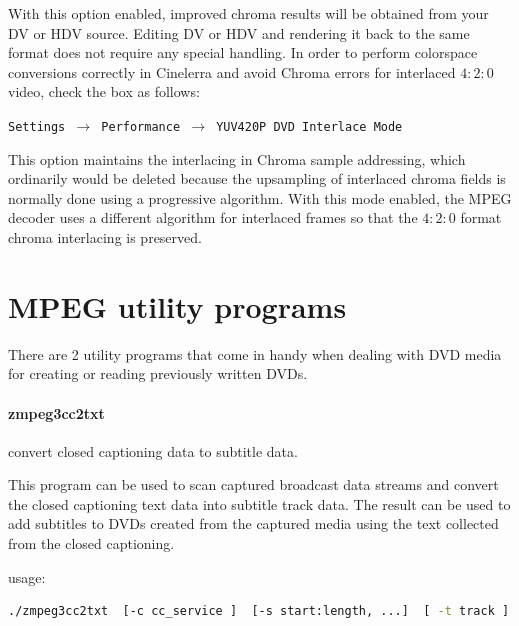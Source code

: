 With this option enabled, improved chroma results will be obtained from your DV or HDV source.
Editing DV or HDV and rendering it back to the same format does not require any special handling.
In order to perform colorspace conversions correctly in Cinelerra and avoid Chroma errors for interlaced $4:2:0$ video, check the box as follows:

\texttt{Settings $\rightarrow$ Performance $\rightarrow$ YUV420P DVD Interlace Mode}

This option maintains the interlacing in Chroma sample addressing, which ordinarily would be deleted
because the upsampling of interlaced chroma fields is normally done using a progressive algorithm.
With this mode enabled, the MPEG decoder uses a different algorithm for interlaced frames so that the
$4:2:0$ format chroma interlacing is preserved.

\section{MPEG utility programs}%
\label{sec:mpeg_utility_programs}

There are 2 utility programs that come in handy when dealing with DVD media for creating or reading previously written DVDs.

\paragraph{zmpeg3cc2txt} convert closed captioning data to subtitle data.

This program can be used to scan captured broadcast data streams and convert the closed captioning text data into subtitle track data.  The result can be used to add subtitles to DVDs created from the captured media using the text collected from the closed captioning.

usage:

\begin{lstlisting}[language=bash]
./zmpeg3cc2txt  [-c cc_service ]  [-s start:length, ...]  [ -t track ]  [-v verbose ] [-w wdw mask ]  [-x file.xml ]  [-o file.udvd ]  file.ts
\end{lstlisting}

